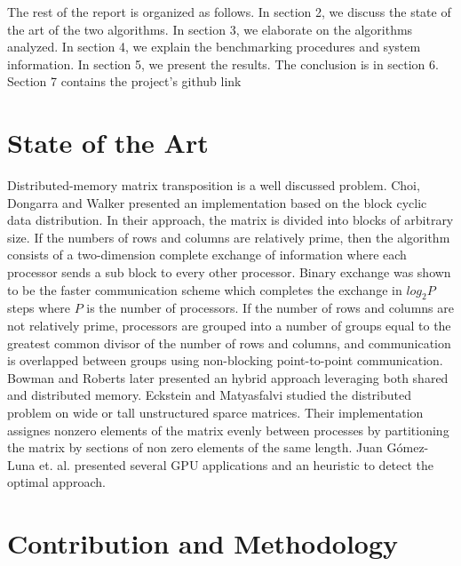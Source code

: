 \documentclass[conference]{IEEEtran}
\begin{document}
The rest of the report is organized as follows.
In section 2, we discuss the state of the art of the two algorithms.
In section 3, we elaborate on the algorithms analyzed.
In section 4, we explain the benchmarking procedures and system
information. In section 5, we present the results. The conclusion
is in section 6. Section 7 contains the project's github link

\section{State of the Art}

\iffalse
- Parallel Matrix Transpose Algorithms on Distributed Memory Concurrent
  Computers
- Adaptive Matrix Transpose Algorithms for Distributed Multicore Processors
- Efficient Distributed-Memory Parallel Matrix-Vector Multiplication with
  Wide or Tall Unstructured Sparse Matrices.
- In-Place Matrix Transposition on GPUs

\fi

Distributed-memory matrix transposition is a well discussed problem.
Choi, Dongarra and Walker \cite{b3} presented an implementation
based on the block cyclic data distribution. In their approach, the
matrix is divided into blocks of arbitrary size. If the numbers of rows and
columns are relatively prime, then the algorithm consists of a two-dimension
complete exchange of information where each processor sends a sub block
to every other processor. Binary exchange was shown to be the faster communication
scheme \cite{b4} which completes the exchange in $log_2 P$ steps where
$P$ is the number of processors. If the number of rows and columns
are not relatively prime, processors are grouped into a number of groups
equal to the greatest common divisor of the number of rows and columns, and
communication is overlapped between groups using
non-blocking point-to-point communication. Bowman and Roberts \cite{b5} later
presented an hybrid approach leveraging both shared and distributed memory.
Eckstein and Matyasfalvi
\cite{b6} studied the distributed problem on wide or tall unstructured sparce matrices.
Their implementation assignes nonzero elements of the matrix evenly
between processes by partitioning the matrix by sections of non zero
elements of the same length. Juan Gómez-Luna et. al. \cite{b7} presented
several GPU applications and an heuristic to detect the optimal approach.

\section{Contribution and Methodology}
\end{document}
